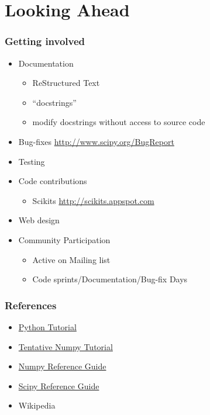 \documentclass[presentation]{beamer}
\begin{document}
\section{Looking Ahead}
\label{sec-6}
\begin{frame}
\frametitle{Getting involved}
\label{sec-6_1}

\begin{itemize}
\item Documentation

\begin{itemize}
\item ReStructured Text
\item ``docstrings''
\item modify docstrings without access to source code
\end{itemize}

\item Bug-fixes
      \href{http://www.scipy.org/BugReport}{http://www.scipy.org/BugReport}
\item Testing
\item Code contributions

\begin{itemize}
\item Scikits \href{http://scikits.appspot.com}{http://scikits.appspot.com}
\end{itemize}

\item Web design
\item Community Participation

\begin{itemize}
\item Active on Mailing list
\item Code sprints/Documentation/Bug-fix Days
\end{itemize}

\end{itemize}
\end{frame}
\begin{frame}
\frametitle{References}
\label{sec-6_2}


\begin{itemize}
\item \href{http://docs.python.org/tutorial/index.html}{Python Tutorial}
\item \href{http://www.scipy.org/Tentative_NumPy_Tutorial}{Tentative Numpy Tutorial}
\item \href{http://docs.scipy.org/doc/numpy/reference/}{Numpy Reference Guide}
\item \href{http://docs.scipy.org/doc/scipy/reference/}{Scipy Reference Guide}
\item Wikipedia
\end{itemize}
\end{frame}
\end{document}
